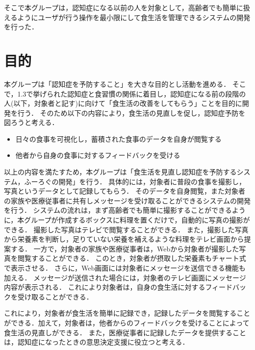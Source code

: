 \documentclass[../report]{subfiles}
\begin{document}
そこで本グループは，認知症になる以前の人を対象として，高齢者でも簡単に扱えるようにユーザが行う操作を最小限にして食生活を管理できるシステムの開発を行った．


\section{目的} \label{sec:objective}
本グループは「認知症を予防すること」を大きな目的とし活動を進める．
そこで，1.3で挙げられた認知症と食習慣の関係に着目し，認知症になる前の段階の人(以下，対象者と記す)に向けて「食生活の改善をしてもらう」ことを目的に開発を行う．
そのため以下の内容により，食生活の見直しを促し，認知症予防を図ろうと考える．

\begin{itemize}
    \item 日々の食事を可視化し，蓄積された食事のデータを自身が閲覧する
    \item 他者から自身の食事に対するフィードバックを受ける
\end{itemize}

以上の内容を満たすため，本グループは「食生活を見直し認知症を予防するシステム，ふーろぐの開発」を行う．
具体的には，対象者に普段の食事を撮影し，写真というデータとして記録してもらう．
そのデータを自身閲覧，また対象者の家族や医療従事者に共有しメッセージを受け取ることができるシステムの開発を行う．
システムの流れは，まず高齢者でも簡単に撮影することができるように，本グループが作成するボックスに料理を置くだけで，自動的に写真の撮影ができる．
撮影した写真はテレビで閲覧することができる．
また，撮影した写真から栄養素を判断し，足りていない栄養を補えるような料理をテレビ画面から提案する．
一方で，対象者の家族や医療従事者は，Webから対象者が撮影した写真を閲覧することができる．
このとき，対象者が摂取した栄養素もチャート式で表示させる．
さらに，Web画面には対象者にメッセージを送信できる機能も加える．
メッセージが送信された場合には，対象者のテレビ画面にメッセージ内容が表示される．
これにより対象者は，自身の食生活に対するフィードバックを受け取ることができる．

これにより，対象者が食生活を簡単に記録でき，記録したデータを閲覧することができる．加えて，対象者は，他者からのフィードバックを受けることによって食生活の見直しができる．
また，医療従事者に記録したデータを提供することは，認知症になったときの意思決定支援に役立つと考える．
\end{document}
